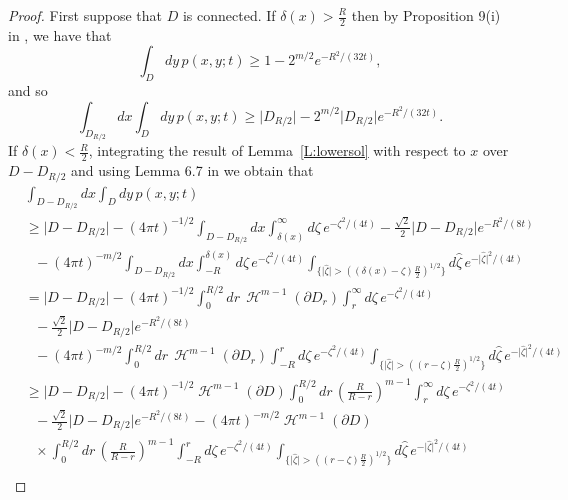 \documentclass[a4paper,9pt]{amsart}
\begin{document}
\begin{proof}
First suppose that $D$ is connected. If $\delta(x) > \frac{R}{2}$
then by Proposition 9(i) in \cite{mvdB13}, we have that
\[\int_{D} dy \, p(x,y;t) \geq 1 - 2^{m/2}e^{-R^{2}/(32t)},\]
and so
\[\int_{D_{R/2}}dx \int_{D} dy \, p(x,y;t) \geq \big\vert D_{R/2} \big\vert
-2^{m/2}\big\vert D_{R/2} \big\vert e^{-R^{2}/(32t)}.\] If
$\delta(x)<\frac{R}{2}$, integrating the result of
Lemma~\ref{L:lowersol} with respect to $x$ over $D - D_{R/2}$ and
using Lemma 6.7 in \cite{vdBD89} we obtain that
\begin{align*}
&\int_{D - D_{R/2}} dx \int_{D} dy \, p(x,y;t)\nonumber \\ & \geq
\big\vert D - D_{R/2} \big \vert - (4\pi t)^{-1/2}\int_{D -
D_{R/2}} dx \int_{\delta(x)}^{\infty} d\zeta \,
e^{-\zeta^{2}/(4t)} -\frac{\sqrt{2}}{2} \big\vert D - D_{R/2}
\big\vert e^{-R^{2}/(8t)}\nonumber \\ &\ \ \  - (4\pi
t)^{-m/2}\int_{D - D_{R/2}} dx \int_{-R} ^{\delta(x)}d\zeta \,
e^{-\zeta^{2}/(4t)}\int_{\{\vert \hat{\zeta} \vert >
\left((\delta(x)-
\zeta)\frac{R}{2}\right)^{1/2}\}}d\hat{\zeta} \, e^{-\vert \hat{\zeta} \vert ^{2}/(4t)}\\
& = \big\vert D - D_{R/2} \big \vert - (4\pi
t)^{-1/2}\int_{0}^{R/2}dr \, \operatorname{\mathcal{H}}^{m-1}(\partial D_{r})
\int_{r}^{\infty}d\zeta \, e^{-\zeta^{2}/(4t)}\nonumber \\ &\ \ \
-\frac{\sqrt{2}}{2} \big\vert D - D_{R/2} \big\vert e^{-R^{2}/(8t)}\\
&\ \ \  - (4\pi t)^{-m/2}\int_{0}^{R/2} dr \, \operatorname{\mathcal{H}}^{m-1}(\partial
D_{r}) \int_{-R} ^{r}d\zeta \, e^{-\zeta^{2}/(4t)}\int_{\{\vert
\hat{\zeta} \vert > \left((r - \zeta)\frac{R}{2}\right)^{1/2}\}}
d\hat{\zeta} \, e^{-\vert \hat{\zeta} \vert ^{2}/(4t)}\\
&\geq \big\vert D - D_{R/2} \big \vert - (4\pi t)^{-1/2}
\operatorname{\mathcal{H}}^{m-1}(\partial D)\int_{0}^{R/2}dr \,
\left(\frac{R}{R-r}\right)^{m-1}\int_{r}^{\infty}d\zeta \,
e^{-\zeta^{2}/(4t)}\nonumber \\ &\ \ \ -\frac{\sqrt{2}}{2}
\big\vert D-D_{R/2} \big\vert e^{-R^{2}/(8t)} - (4\pi
t)^{-m/2}\operatorname{\mathcal{H}}^{m-1}(\partial D)\nonumber \\ &\ \ \
\times\int_{0}^{R/2} dr \, \left(\frac{R}{R-r}\right)^{m-1}
\int_{-R} ^{r}d\zeta \, e^{-\zeta^{2}/(4t)}\int_{\{\vert
\hat{\zeta} \vert > \left((r - \zeta)\frac{R}{2}\right)^{1/2}\}}
d\hat{\zeta} \, e^{-\vert \hat{\zeta} \vert ^{2}/(4t)}\\

\end{align*}
\end{proof}
\end{document}
